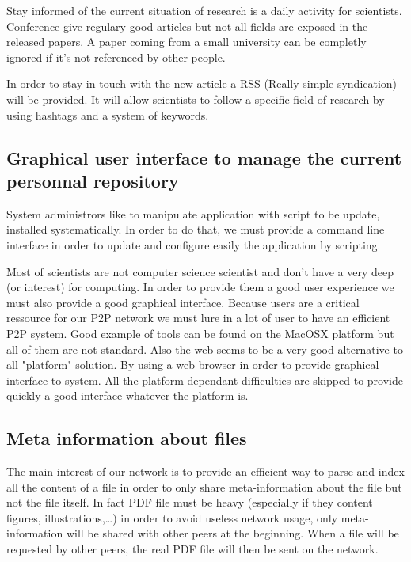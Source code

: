 Stay informed of the current situation of research is a daily
activity for scientists. Conference give regulary good articles but
not all fields are exposed in the released papers. A paper coming from
a small university can be completly ignored if it's not referenced by
other people.

In order to stay in touch with the new article a RSS 
(Really simple syndication) will be provided. It will allow scientists
to follow a specific field of research by using hashtags and a system
of keywords.

\subsection{Graphical user interface to manage the current personnal repository}

System administrors like to manipulate application with script to be update, installed
systematically. In order to do that, we must provide a command line interface in order
to update and configure easily the application by scripting.

Most of scientists are not computer science scientist and don't have a very deep (or interest)
for computing. In order to provide them a good user experience we must also provide a good 
graphical interface. Because users are a critical ressource for our P2P network we 
must lure in a lot of user to have an efficient P2P system. Good example
of tools can be found on the MacOSX platform but all of them
are not standard. Also the web seems to be a very good alternative
to all "platform" solution. By using a web-browser in order
to provide graphical interface to system. All the platform-dependant
difficulties are skipped to provide quickly a good interface whatever
the platform is.

\subsection{Meta information about files}

The main interest of our network is to provide an efficient way to parse and
index all the content of a file in order to only share meta-information about the
file but not the file itself. In fact PDF file must be heavy (especially if
they content figures, illustrations,\ldots) in order to avoid useless network usage,
only meta-information will be shared with other peers at the beginning. When a file
will be requested by other peers, the real PDF file will then be sent on the network.

